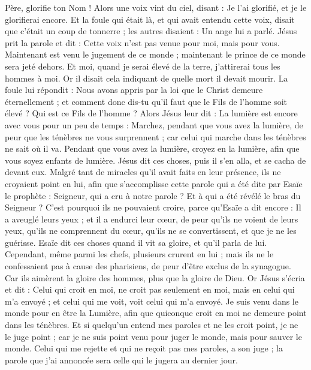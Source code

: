 \begin{multicols}{2}
Père, glorifie ton Nom ! Alors une voix vint du ciel, disant : Je l'ai glorifié, et je le glorifierai encore.
Et la foule qui était là, et qui avait entendu cette voix, disait que c'était un coup de tonnerre ; les autres disaient : Un ange lui a parlé.
Jésus prit la parole et dit : Cette voix n'est pas venue pour moi, mais pour vous.
Maintenant est venu le jugement de ce monde ; maintenant le prince de ce monde sera jeté dehors.
Et moi, quand je serai élevé de la terre, j'attirerai tous les hommes à moi.
Or il disait cela indiquant de quelle mort il devait mourir.
La foule lui répondit : Nous avons appris par la loi que le Christ demeure éternellement ; et comment donc dis-tu qu'il faut que le Fils de l'homme soit élevé ? Qui est ce Fils de l'homme ?
Alors Jésus leur dit : La lumière est encore avec vous pour un peu de temps : Marchez, pendant que vous avez la lumière, de peur que les ténèbres ne vous surprennent ; car celui qui marche dans les ténèbres ne sait où il va.
Pendant que vous avez la lumière, croyez en la lumière, afin que vous soyez enfants de lumière. Jésus dit ces choses, puis il s'en alla, et se cacha de devant eux.
Malgré tant de miracles qu'il avait faits en leur présence, ils ne croyaient point en lui,
afin que s'accomplisse cette parole qui a été dite par Esaïe le prophète : Seigneur, qui a cru à notre parole ? Et à qui a été révélé le bras du Seigneur ?
C'est pourquoi ils ne pouvaient croire, parce qu'Esaïe a dit encore :
Il a aveuglé leurs yeux ; et il a endurci leur cœur, de peur qu'ils ne voient de leurs yeux, qu'ils ne comprennent du cœur, qu'ils ne se convertissent, et que je ne les guérisse.
Esaïe dit ces choses quand il vit sa gloire, et qu'il parla de lui.
Cependant, même parmi les chefs, plusieurs crurent en lui ; mais ils ne le confessaient pas à cause des pharisiens, de peur d'être exclus de la synagogue.
Car ils aimèrent la gloire des hommes, plus que la gloire de Dieu.
Or Jésus s'écria et dit : Celui qui croit en moi, ne croit pas seulement en moi, mais en celui qui m'a envoyé ;
et celui qui me voit, voit celui qui m'a envoyé.
Je suis venu dans le monde pour en être la Lumière, afin que quiconque croit en moi ne demeure point dans les ténèbres.
Et si quelqu'un entend mes paroles et ne les croit point, je ne le juge point ; car je ne suis point venu pour juger le monde, mais pour sauver le monde.
Celui qui me rejette et qui ne reçoit pas mes paroles, a son juge ; la parole que j'ai annoncée sera celle qui le jugera au dernier jour.

\end{multicols}
